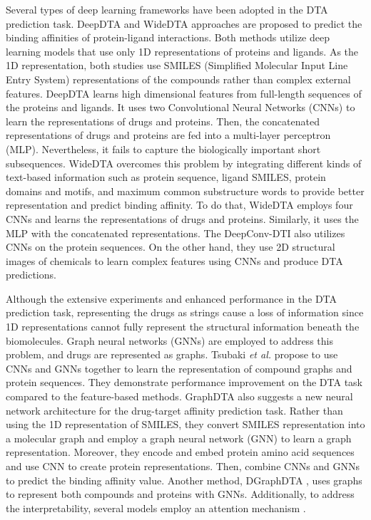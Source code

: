 Several types of deep learning frameworks have been adopted in the DTA prediction task. DeepDTA \cite{ozturk2018deepdta} and WideDTA \cite{ozturk2019widedta} approaches are proposed to predict the binding affinities of protein-ligand interactions. Both methods utilize deep learning models that use only 1D representations of proteins and ligands. As the 1D representation, both studies use SMILES (Simplified Molecular Input Line Entry System) representations of the compounds rather than complex external features. DeepDTA learns high dimensional features from full-length sequences of the proteins and ligands. It uses two Convolutional Neural Networks (CNNs) to learn the representations of drugs and proteins. Then, the concatenated representations of drugs and proteins are fed into a multi-layer perceptron (MLP). 
Nevertheless, it fails to capture the biologically important short subsequences. WideDTA overcomes this problem by integrating different kinds of text-based information such as protein sequence, ligand SMILES, protein domains and motifs, and maximum common substructure words to provide better representation and predict binding affinity. To do that, WideDTA employs four CNNs and learns the representations of drugs and proteins. 
Similarly, it uses the MLP with the concatenated representations. The DeepConv-DTI \cite{lee2019deepconv} also utilizes CNNs on the protein sequences. On the other hand, they use 2D structural images of chemicals to learn complex features using CNNs and produce DTA predictions.

Although the extensive experiments and enhanced performance in the DTA prediction task, representing the drugs as strings cause a loss of information since 1D representations cannot fully represent the structural information beneath the biomolecules. Graph neural networks (GNNs) are employed to address this problem, and drugs are represented as graphs. Tsubaki \textit{et al.} \cite{tsubaki2019compound} propose to use CNNs and GNNs together to learn the representation of compound graphs and protein sequences. They demonstrate performance improvement on the DTA task compared to the feature-based methods. GraphDTA \cite{nguyen2019graphdta} also suggests a new neural network architecture for the drug-target affinity prediction task. Rather than using the 1D representation of SMILES, they convert SMILES representation into a molecular graph and employ a graph neural network (GNN) to learn a graph representation. Moreover, they encode and embed protein amino acid sequences and use CNN to create protein representations. Then, combine CNNs and GNNs to predict the binding affinity value. Another method, DGraphDTA \cite{jiang2020drug}, uses graphs to represent both compounds and proteins with GNNs. Additionally, to address the interpretability, several models employ an attention mechanism \cite{karimi2020explainable, chen2020transformercpi, agyemang2020multi, yang2021ml}. 

